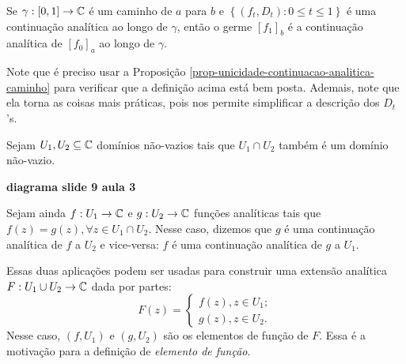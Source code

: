     \begin{definicao}
    \label{def-continuacao-analitica-germe}
        Se $\gamma: [0,1]\to\mathbb{C}$ é um caminho de $a$ para $b$ e 
        $\left\{ (f_t, D_t): 0\leq t\leq 1 \right\}$ é uma continuação analítica ao
        longo de $\gamma$, então o germe $[f_1]_b$ é a continuação analítica de
        $[f_0]_a$ ao longo de $\gamma$.
    \end{definicao}

Note que é preciso usar a Proposição \ref{prop-unicidade-continuacao-analitica-caminho}
para verificar que a definição acima está bem posta. Ademais, note que ela torna
as coisas mais práticas, pois nos permite simplificar a descrição dos $D_t$'s.

    \begin{observacao}
        Sejam $U_1, U_2\subseteq\mathbb{C}$ domínios não-vazios tais que $U_1\cap U_2$
        também é um domínio não-vazio.
        \begin{center}
            \textbf{diagrama slide 9 aula 3}
        \end{center}
        Sejam ainda $f:U_1\to\mathbb{C}$ e $g:U_2\to\mathbb{C}$ funções analíticas
        tais que $f(z) = g(z), \forall z\in U_1\cap U_2$. Nesse caso, dizemos que
        $g$ é uma continuação analítica de $f$ a $U_2$ e vice-versa: $f$ é 
        uma continuação analítica de $g$ a $U_1$.
        
        Essas duas aplicações podem ser usadas para construir uma extensão analítica
        $F: U_1\cup U_2\to\mathbb{C}$ dada por partes:
        \begin{equation*}
            F(z) = 
            \begin{cases}
                f(z), z\in U_1; \\
                g(z), z\in U_2.
            \end{cases}
        \end{equation*}
        Nesse caso, $(f,U_1)$ e $(g,U_2)$ são os elementos de função de $F$. 
        Essa é a motivação para a definição de \textit{elemento de função}.
        

\end{observacao}
